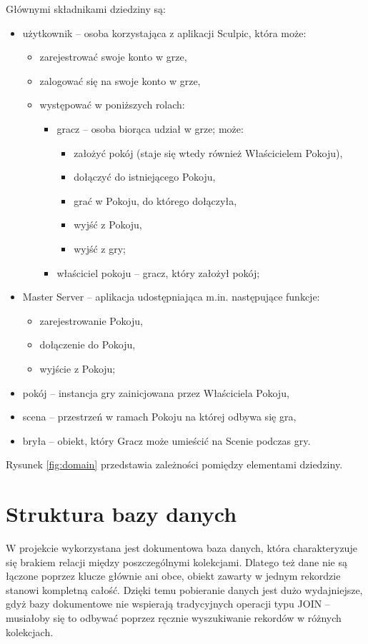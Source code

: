 Głównymi składnikami dziedziny są:
\begin{itemize}
    \item użytkownik – osoba korzystająca z aplikacji Sculpic, która może:
    \begin{itemize}
        \item zarejestrować swoje konto w grze,
        \item zalogować się na swoje konto w grze,
        \item występować w poniższych rolach:
        \begin{itemize}
            \item gracz – osoba biorąca udział w grze; może:
            \begin{itemize}
                \item założyć pokój (staje się wtedy również Właścicielem Pokoju),
                \item dołączyć do istniejącego Pokoju,
                \item grać w Pokoju, do którego dołączyła,
                \item wyjść z Pokoju,
                \item wyjść z gry;
            \end{itemize}
            \item właściciel pokoju – gracz, który założył pokój;
        \end{itemize}
    \end{itemize}
    \item Master Server – aplikacja udostępniająca m.in. następujące funkcje:
    \begin{itemize}
        \item zarejestrowanie Pokoju,
        \item dołączenie do Pokoju,
        \item wyjście z Pokoju;
    \end{itemize}
    \item pokój – instancja gry zainicjowana przez Właściciela Pokoju,
    \item scena – przestrzeń w ramach Pokoju na której odbywa się gra,
    \item bryła – obiekt, który Gracz może umieścić na Scenie podczas gry.
\end{itemize}

Rysunek \ref{fig:domain} przedstawia zależności pomiędzy elementami dziedziny.

\section{Struktura bazy danych}
W projekcie wykorzystana jest dokumentowa baza danych, która charakteryzuje się brakiem relacji między poszczególnymi kolekcjami. Dlatego też dane nie są łączone poprzez klucze głównie ani obce, obiekt zawarty w jednym rekordzie stanowi kompletną całość. Dzięki temu pobieranie danych jest dużo wydajniejsze, gdyż bazy dokumentowe nie wspierają tradycyjnych operacji typu JOIN – musiałoby się to odbywać poprzez ręcznie wyszukiwanie rekordów w różnych kolekcjach.

